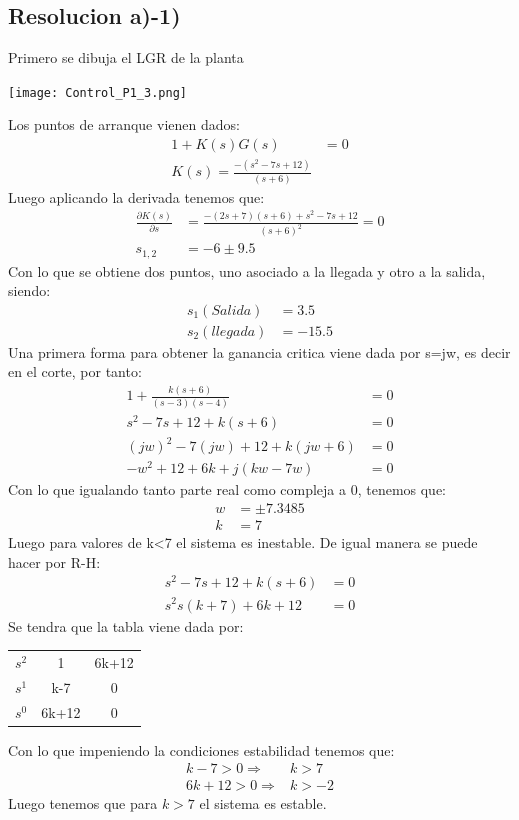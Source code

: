 \documentclass[
  11pt,
  letterpaper,
   addpoints,
  ]{exam}
\begin{document}
\begin{questions}
\begin{solution}
\subsection*{Resolucion a)-1)}
Primero se dibuja el LGR de la planta
\begin{center}
    \texttt{[image: Control\_P1\_3.png]}
\end{center}
Los puntos de arranque vienen dados:
\begin{align}
    1+K(s)G(s) &= 0\\
    K(s) = \frac{-(s^{2}-7s+12)}{(s+6)}
\end{align}
Luego aplicando la derivada tenemos que:
\begin{align}
    \frac{\partial K(s)}{\partial s} &= \frac{-(2s+7)(s+6)+s^{2}-7s+12}{(s+6)^{2}}=0\\
    s_{1,2} &= -6 \pm 9.5
\end{align}
Con lo que se obtiene dos puntos, uno asociado a la llegada y otro a la salida, siendo:
\begin{align}
    s_{1}(Salida) &= 3.5\\
    s_{2}(llegada) &= -15.5
\end{align}
Una primera forma para obtener la ganancia critica viene dada por s=jw, es decir en el corte, por tanto:
\begin{align}
    1+ \frac{k(s+6)}{(s-3)(s-4)}&=0\\
    s^{2}-7s +12 +k(s+6)&=0\\
    (jw)^{2} -7(jw) + 12 + k(jw+6) &=0\\
    -w^{2} +12 +6k + j(kw-7w) &=0
\end{align}
Con lo que igualando tanto parte real como compleja a 0, tenemos que:
\begin{align}
    w &= \pm 7.3485\\
    k &= 7
\end{align}
Luego para valores de k<7 el sistema es inestable. De igual manera se puede hacer por R-H:
\begin{align}
    s^{2} -7s +12 + k(s+6) &=0\\
    s^{2} s(k+7) +6k+12 &= 0
\end{align} 
Se tendra que la tabla viene dada por:
\begin{center}
    \begin{tabular}{|c|cc|}
        \hline
        $s^{2}$ & 1 & 6k+12\\
        $s^{1}$ & k-7 & 0\\
        $s^{0}$ & 6k+12 & 0\\
        \hline
    \end{tabular}
\end{center}
Con lo que impeniendo la condiciones estabilidad tenemos que:
\begin{align}
    k-7 > 0    \Rightarrow& k>7 \\
    6k+12 > 0  \Rightarrow& k>-2
\end{align}
Luego tenemos que para $k > 7$ el sistema es estable.

\end{solution}
\end{questions}
\end{document}
